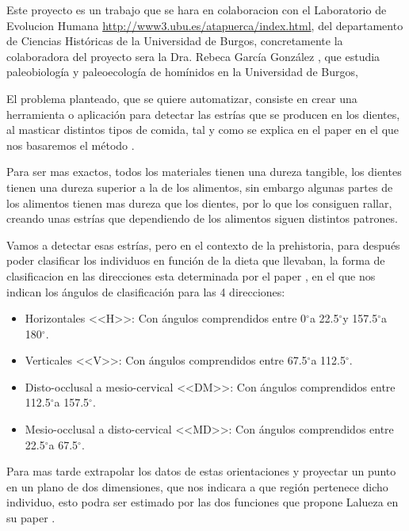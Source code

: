 \newcommand{\grad}{$^{\circ}$}
Este proyecto es un trabajo que se hara en colaboracion con el Laboratorio de Evolucion Humana \url{http://www3.ubu.es/atapuerca/index.html}, del departamento de Ciencias Históricas de la Universidad de Burgos, concretamente la colaboradora del proyecto sera la Dra. Rebeca García González \cite{ubu:Rebe},  que estudia paleobiología y paleoecología de homínidos en la Universidad de Burgos, 

El problema planteado, que se quiere automatizar, consiste en crear una herramienta o aplicación para detectar las estrías que se producen en los dientes, al masticar distintos tipos de comida, tal y como se explica en el paper en el que nos basaremos el método \cite{garcia2015dietary}.

Para ser mas exactos, todos los materiales tienen una dureza tangible, los dientes tienen una dureza superior a la de los alimentos, sin embargo  algunas partes de los alimentos tienen mas dureza que los dientes, por lo que los consiguen rallar, creando unas estrías que dependiendo de los alimentos siguen distintos patrones.

 
Vamos a detectar esas estrías, pero en el contexto de la prehistoria, para después poder clasificar los individuos en función de la dieta que llevaban, la forma de clasificacion en las direcciones esta determinada por el paper \cite{garcia2015dietary}, en el que nos indican los ángulos de clasificación para las 4 direcciones:
\begin{itemize}
\item Horizontales <<H>>: Con ángulos comprendidos entre 0\grad a 22.5\grad y 157.5\grad a 180\grad.
\item Verticales <<V>>: Con ángulos comprendidos entre 67.5\grad a 112.5\grad. 
\item Disto-occlusal a mesio-cervical <<DM>>: Con ángulos comprendidos entre 112.5\grad a 157.5\grad.
\item Mesio-occlusal a disto-cervical <<MD>>: Con ángulos comprendidos entre 22.5\grad a 67.5\grad.
\end{itemize}
Para mas tarde extrapolar los datos de estas orientaciones y proyectar un punto en un plano de dos dimensiones, que nos indicara a que región pertenece dicho individuo, esto podra ser estimado por las dos funciones que propone Lalueza en su paper \cite{Lalueza:perez}. 


